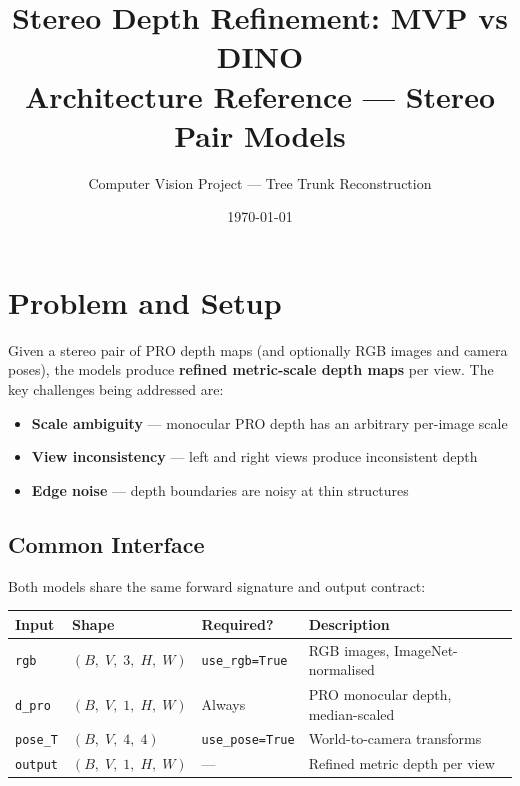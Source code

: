 \documentclass[11pt]{article}
\title{\textbf{Stereo Depth Refinement: MVP vs DINO}\\
\large Architecture Reference --- Stereo Pair Models}
\author{Computer Vision Project --- Tree Trunk Reconstruction}
\date{\today}
\begin{document}
\maketitle
\tableofcontents
\newpage

\section{Problem and Setup}

Given a stereo pair of PRO depth maps (and optionally RGB images and camera
poses), the models produce \textbf{refined metric-scale depth maps} per view.
The key challenges being addressed are:

\begin{itemize}[leftmargin=2em]
    \item \textbf{Scale ambiguity} --- monocular PRO depth has an arbitrary per-image scale
    \item \textbf{View inconsistency} --- left and right views produce inconsistent depth
    \item \textbf{Edge noise} --- depth boundaries are noisy at thin structures
\end{itemize}

\subsection{Common Interface}

Both models share the same forward signature and output contract:

\begin{center}
\begin{tabular}{llll}
\toprule
\textbf{Input} & \textbf{Shape} & \textbf{Required?} & \textbf{Description} \\
\midrule
\texttt{rgb}    & $(B,\;V,\;3,\;H,\;W)$ & \texttt{use\_rgb=True} & RGB images, ImageNet-normalised \\
\texttt{d\_pro} & $(B,\;V,\;1,\;H,\;W)$ & Always                 & PRO monocular depth, median-scaled \\
\texttt{pose\_T}& $(B,\;V,\;4,\;4)$     & \texttt{use\_pose=True} & World-to-camera transforms \\
\midrule
\texttt{output} & $(B,\;V,\;1,\;H,\;W)$ & ---                    & Refined metric depth per view \\
\bottomrule
\end{tabular}
\end{center}
\end{document}
